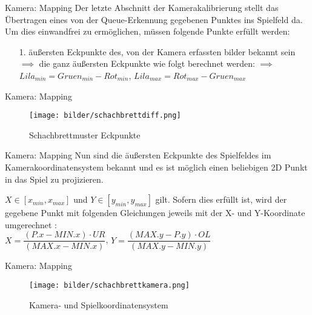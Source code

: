 
\begin{frame}{Kamera: Mapping}
	Der letzte Abschnitt der Kamerakalibrierung stellt das Übertragen eines von der Queue-Erkennung gegebenen Punktes ins Spielfeld da. Um dies einwandfrei zu ermöglichen, müssen folgende Punkte erfüllt werden:
	\begin{itemize}
		\item[1.] äußersten Eckpunkte des, von der Kamera erfassten bilder bekannt sein\\
		$\implies$ die ganz äußersten Eckpunkte wie folgt berechnet werden:
		$\implies$ $Lila_{min} = Gruen_{min} - Rot_{min}$, $Lila_{max} = Rot_{max} - Gruen_{max}$
		\pause
	\end{itemize}	
\end{frame}

\begin{frame}{Kamera: Mapping}
		\begin{figure}[h]
		\centering
		\texttt{[image: bilder/schachbrettdiff.png]}
		\caption{Schachbrettmuster Eckpunkte}
	\end{figure}
\end{frame}

\begin{frame}{Kamera: Mapping}
	Nun sind die äußersten Eckpunkte des Spielfeldes im Kamerakoordinatensystem bekannt und es ist möglich einen beliebigen 2D Punkt in das Spiel zu projizieren.
	
	$X \in [x_{min}, x_{max}]$ und $Y \in [y_{min},y_{max}]$ gilt.
	Sofern dies erfüllt ist, wird der gegebene Punkt mit folgenden Gleichungen jeweils mit der X- und Y-Koordinate umgerechnet :\\
	$X = \dfrac{(P.x - MIN.x) \cdot UR}{(MAX.x - MIN.x)}$, 
	$Y = \dfrac{(MAX.y - P.y) \cdot OL}{(MAX.y - MIN.y)}$
	
\end{frame}

\begin{frame}{Kamera: Mapping}
	\begin{figure}[h]
		\centering
		\texttt{[image: bilder/schachbrettkamera.png]}
		\caption{Kamera- und Spielkoordinatensystem}
	\end{figure}
\end{frame}